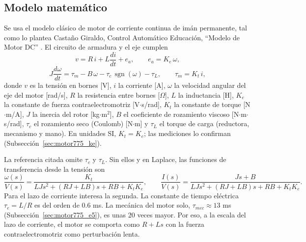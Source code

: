\subsection{Modelo matemático}
\label{sec:motor775_modelo}
Se usa el modelo clásico de motor de corriente continua de imán permanente, tal como lo plantea Castaño Giraldo, Control Automático Educación, ``Modelo de Motor DC'' \cite{castano}. El circuito de armadura y el eje cumplen
\begin{equation}
v = R\,i + L\frac{di}{dt} + e_a,\qquad e_a = K_e\,\omega,
\label{eq:motor775_electrica}
\end{equation}
\begin{equation}
J\frac{d\omega}{dt} = \tau_m - B\,\omega - \tau_c\,\operatorname{sgn}(\omega) - \tau_L,\qquad \tau_m = K_t\,i,
\label{eq:motor775_mecanica}
\end{equation}
donde $v$ es la tensión en bornes [V], $i$ la corriente [A], $\omega$ la velocidad angular del eje del motor [rad/s], $R$ la resistencia entre bornes [$\Omega$], $L$ la inductancia [H], $K_e$ la constante de fuerza contraelectromotriz [V$\cdot$s/rad], $K_t$ la constante de torque [N$\cdot$m/A], $J$ la inercia del rotor [kg$\cdot$m$^2$], $B$ el coeficiente de rozamiento viscoso [N$\cdot$m$\cdot$s/rad], $\tau_c$ el rozamiento seco (Coulomb) [N$\cdot$m] y $\tau_L$ el torque de carga (reductora, mecanismo y mano). En unidades SI, $K_t = K_e$; las mediciones lo confirman (Subsección~\ref{sec:motor775_ke}).

La referencia citada omite $\tau_c$ y $\tau_L$. Sin ellos y en Laplace, las funciones de transferencia desde la tensión son
\begin{equation}
\frac{\omega(s)}{V(s)} = \frac{K_t}{LJs^2 + (RJ + LB)s + RB + K_tK_e},\qquad
\frac{I(s)}{V(s)} = \frac{Js + B}{LJs^2 + (RJ + LB)s + RB + K_tK_e}.
\label{eq:motor775_tf}
\end{equation}
Para el lazo de corriente interesa la segunda. La constante de tiempo eléctrica $\tau_e = L/R$ es del orden de 0.6 ms. La mecánica del motor solo, $\tau_{mec} \approx 13$ ms (Subsección~\ref{sec:motor775_e5}), es unas 20 veces mayor. Por eso, a la escala del lazo de corriente, el motor se comporta como $R + Ls$ con la fuerza contraelectromotriz como perturbación lenta.

